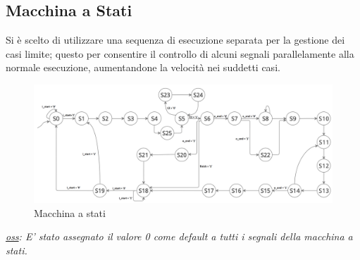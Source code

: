 \subsection{Macchina a Stati}

Si è scelto di utilizzare una sequenza di esecuzione separata per la gestione dei casi limite; questo per consentire il controllo di alcuni segnali parallelamente alla normale esecuzione, aumentandone la velocità nei suddetti casi. 

\begin{figure}[ht]
    \centering
    \includegraphics[scale = 0.182]{Figure/macchina a stati}
    \caption{Macchina a stati}
    \label{ms}
\end{figure}

\textit{\underline{oss}: E' stato assegnato il valore 0 come default a tutti i segnali della macchina a stati.}\\

